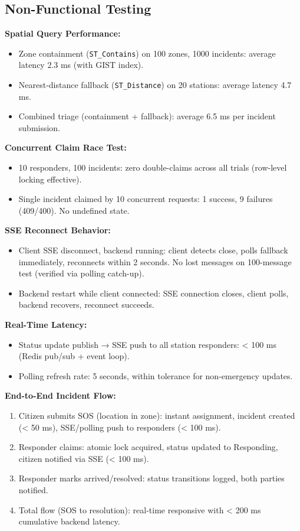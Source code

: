\subsection{Non-Functional Testing}

\textbf{Spatial Query Performance:}
\begin{itemize}
  \item Zone containment (\texttt{ST\_Contains}) on 100 zones, 1000 incidents: average latency 2.3 ms (with GIST index).
  \item Nearest-distance fallback (\texttt{ST\_Distance}) on 20 stations: average latency 4.7 ms.
  \item Combined triage (containment + fallback): average 6.5 ms per incident submission.
\end{itemize}

\textbf{Concurrent Claim Race Test:}
\begin{itemize}
  \item 10 responders, 100 incidents: zero double-claims across all trials (row-level locking effective).
  \item Single incident claimed by 10 concurrent requests: 1 success, 9 failures (409/400). No undefined state.
\end{itemize}

\textbf{SSE Reconnect Behavior:}
\begin{itemize}
  \item Client SSE disconnect, backend running: client detects close, polls fallback immediately, reconnects within 2 seconds. No lost messages on 100-message test (verified via polling catch-up).
  \item Backend restart while client connected: SSE connection closes, client polls, backend recovers, reconnect succeeds.
\end{itemize}

\textbf{Real-Time Latency:}
\begin{itemize}
  \item Status update publish → SSE push to all station responders: < 100 ms (Redis pub/sub + event loop).
  \item Polling refresh rate: 5 seconds, within tolerance for non-emergency updates.
\end{itemize}

\textbf{End-to-End Incident Flow:}
\begin{enumerate}
  \item Citizen submits SOS (location in zone): instant assignment, incident created (< 50 ms), SSE/polling push to responders (< 100 ms).
  \item Responder claims: atomic lock acquired, status updated to Responding, citizen notified via SSE (< 100 ms).
  \item Responder marks arrived/resolved: status transitions logged, both parties notified.
  \item Total flow (SOS to resolution): real-time responsive with < 200 ms cumulative backend latency.
\end{enumerate}

